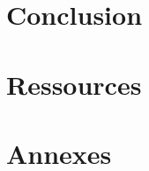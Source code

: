\documentclass{backend}
\begin{document}
% 
% 


\backmatter %

\part{Conclusion}




\part{Ressources}
\nocite{*}

\printbibliography

\printindex

\renewcommand\listoflistingscaption{Listes des codes}
\listoffigures
\listoflistings
\listoftables


\part*{Annexes}

\appendix

\end{document}
